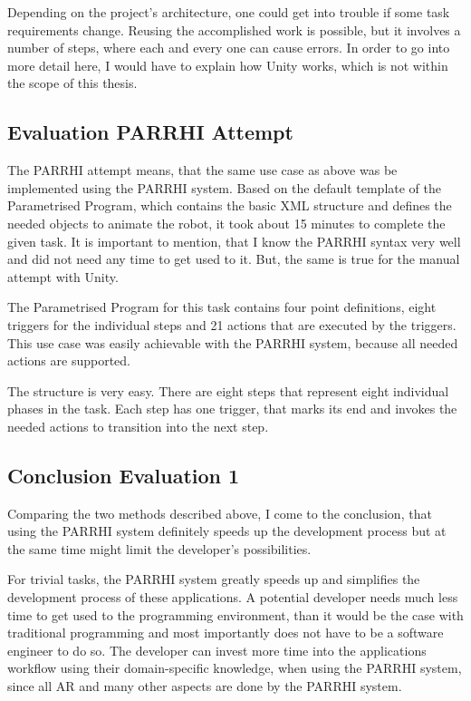 Depending on the project's architecture, one could get into trouble if some task requirements change. Reusing the accomplished work is possible, but it involves a number of steps, where each and every one can cause errors. In order to go into more detail here, I would have to explain how Unity works, which is not within the scope of this thesis. 

\subsection{Evaluation PARRHI Attempt}
The PARRHI attempt means, that the same use case as above was be implemented using the PARRHI system. Based on the default template of the Parametrised Program, which contains the basic XML structure and defines the needed objects to animate the robot, it took about 15 minutes to complete the given task. It is important to mention, that I know the PARRHI syntax very well and did not need any time to get used to it. But, the same is true for the manual attempt with Unity.

The Parametrised Program for this task contains four point definitions, eight triggers for the individual steps and 21 actions that are executed by the triggers. This use case was easily achievable with the PARRHI system, because all needed actions are supported. 

The structure is very easy. There are eight steps that represent eight individual phases in the task. Each step has one trigger, that marks its end and invokes the needed actions to transition into the next step. 

\subsection{Conclusion Evaluation 1}
Comparing the two methods described above, I come to the conclusion, that using the PARRHI system definitely speeds up the development process but at the same time might limit the developer's possibilities. 

For trivial tasks, the PARRHI system greatly speeds up and simplifies the development process of these applications. A potential developer needs much less time to get used to the programming environment, than it would be the case with traditional programming and most importantly does not have to be a software engineer to do so. The developer can invest more time into the applications workflow using their domain-specific knowledge, when using the PARRHI system, since all AR and many other aspects are done by the PARRHI system.

